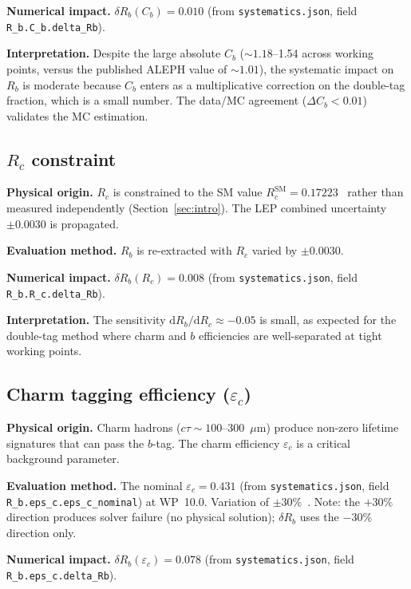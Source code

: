 \documentclass[11pt,a4paper]{article}
\begin{document}
\textbf{Numerical impact.}
$\delta R_b(C_b) = 0.010$
(from \texttt{systematics.json}, field \texttt{R\_b.C\_b.delta\_Rb}).

\textbf{Interpretation.} Despite the large absolute $C_b$ ($\sim 1.18$--1.54 across
working points, versus the published ALEPH value of $\sim 1.01$), the systematic impact
on $R_b$ is moderate because $C_b$ enters as a multiplicative correction on the
double-tag fraction, which is a small number. The data/MC agreement ($\Delta C_b < 0.01$)
validates the MC estimation.

\subsection{$R_c$ constraint}
\label{sec:syst_rc}

\textbf{Physical origin.} $R_c$ is constrained to the SM value
$R_c^\mathrm{SM} = 0.17223$~\cite{LEP:EWWG:2005} rather than measured independently
(Section~\ref{sec:intro}). The LEP combined uncertainty $\pm 0.0030$ is propagated.

\textbf{Evaluation method.} $R_b$ is re-extracted with $R_c$ varied by $\pm 0.0030$.

\textbf{Numerical impact.}
$\delta R_b(R_c) = 0.008$
(from \texttt{systematics.json}, field \texttt{R\_b.R\_c.delta\_Rb}).

\textbf{Interpretation.} The sensitivity $\mathrm{d}R_b/\mathrm{d}R_c \approx -0.05$
is small, as expected for the double-tag method where charm and $b$ efficiencies are
well-separated at tight working points.

\subsection{Charm tagging efficiency ($\varepsilon_c$)}
\label{sec:syst_eps_c}

\textbf{Physical origin.} Charm hadrons ($c\tau \sim 100$--300~$\mu$m) produce
non-zero lifetime signatures that can pass the $b$-tag. The charm efficiency
$\varepsilon_c$ is a critical background parameter.

\textbf{Evaluation method.} The nominal $\varepsilon_c = 0.431$
(from \texttt{systematics.json}, field \texttt{R\_b.eps\_c.eps\_c\_nominal})
at WP~10.0. Variation of $\pm 30\%$~\cite{LEP:HF:2001}. Note: the $+30\%$ direction
produces solver failure (no physical solution); $\delta R_b$ uses the $-30\%$ direction
only.

\textbf{Numerical impact.}
$\delta R_b(\varepsilon_c) = 0.078$
(from \texttt{systematics.json}, field \texttt{R\_b.eps\_c.delta\_Rb}).
\end{document}
